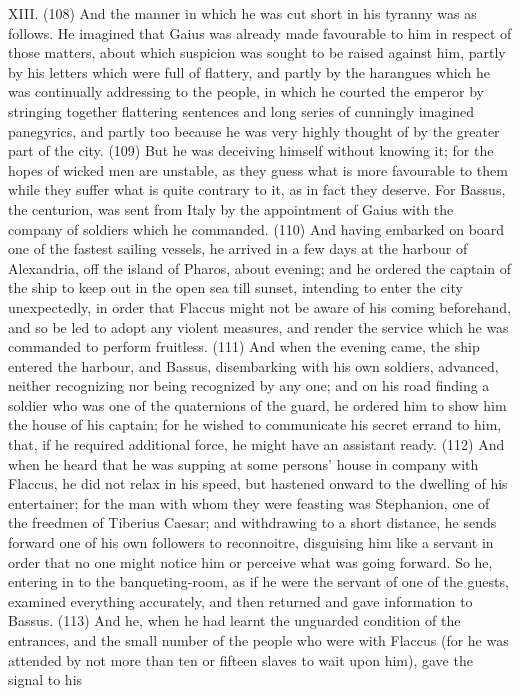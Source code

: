XIII. (108) And the manner in which he was cut short in his tyranny was as follows. He imagined
that Gaius was already made favourable to him in respect of those matters, about which suspicion
was sought to be raised against him, partly by his letters which were full of flattery, and partly by the
harangues which he was continually addressing to the people, in which he courted the emperor by
stringing together flattering sentences and long series of cunningly imagined panegyrics, and partly
too because he was very highly thought of by the greater part of the city. (109) But he was
deceiving himself without knowing it; for the hopes of wicked men are unstable, as they guess what
is more favourable to them while they suffer what is quite contrary to it, as in fact they deserve. For
Bassus, the centurion, was sent from Italy by the appointment of Gaius with the company of
soldiers which he commanded. (110) And having embarked on board one of the fastest sailing
vessels, he arrived in a few days at the harbour of Alexandria, off the island of Pharos, about
evening; and he ordered the captain of the ship to keep out in the open sea till sunset, intending to
enter the city unexpectedly, in order that Flaccus might not be aware of his coming beforehand,
and so be led to adopt any violent measures, and render the service which he was commanded to
perform fruitless. (111) And when the evening came, the ship entered the harbour, and Bassus,
disembarking with his own soldiers, advanced, neither recognizing nor being recognized by any
one; and on his road finding a soldier who was one of the quaternions of the guard, he ordered him
to show him the house of his captain; for he wished to communicate his secret errand to him, that,
if he required additional force, he might have an assistant ready. (112) And when he heard that he
was supping at some persons' house in company with Flaccus, he did not relax in his speed, but
hastened onward to the dwelling of his entertainer; for the man with whom they were feasting was
Stephanion, one of the freedmen of Tiberius Caesar; and withdrawing to a short distance, he
sends forward one of his own followers to reconnoitre, disguising him like a servant in order that no
one might notice him or perceive what was going forward. So he, entering in to the
banqueting-room, as if he were the servant of one of the guests, examined everything accurately,
and then returned and gave information to Bassus. (113) And he, when he had learnt the
unguarded condition of the entrances, and the small number of the people who were with Flaccus
(for he was attended by not more than ten or fifteen slaves to wait upon him), gave the signal to his
